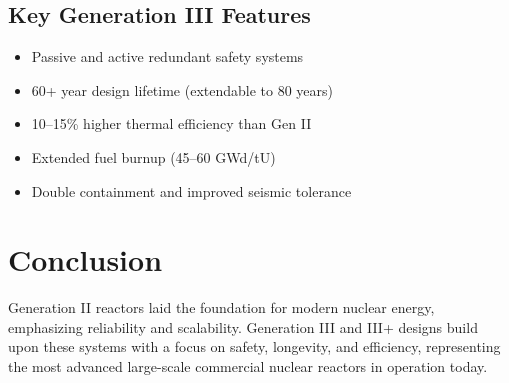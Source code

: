 \documentclass[a4paper,12pt]{article}
\begin{document}
\subsection{Key Generation III Features}
\begin{itemize}
    \item Passive and active redundant safety systems
    \item 60+ year design lifetime (extendable to 80 years)
    \item 10--15\% higher thermal efficiency than Gen II
    \item Extended fuel burnup (45--60 GWd/tU)
    \item Double containment and improved seismic tolerance
\end{itemize}

\section{Conclusion}
Generation II reactors laid the foundation for modern nuclear energy, emphasizing reliability and scalability. Generation III and III+ designs build upon these systems with a focus on safety, longevity, and efficiency, representing the most advanced large-scale commercial nuclear reactors in operation today.
\end{document}
